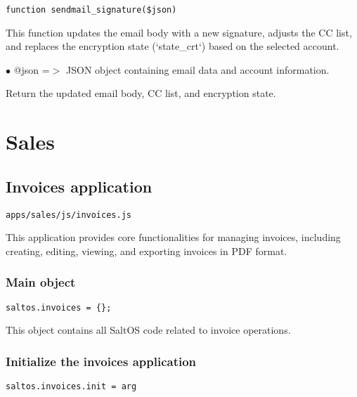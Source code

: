 \documentclass[a4paper]{article}
\begin{document}
\begin{lstlisting}
function sendmail_signature($json)
\end{lstlisting}

This function updates the email body with a new signature, adjusts the CC list,
and replaces the encryption state (`state\_crt`) based on the selected account.

\begin{compactitem}
\item[\color{myblue}$\bullet$] @json =$>$ JSON object containing email data and account information.
\end{compactitem}

Return the updated email body, CC list, and encryption state.


\hypertarget{toc153}{}
\section{Sales}

\hypertarget{toc154}{}
\subsection{Invoices application}

\begin{lstlisting}
apps/sales/js/invoices.js
\end{lstlisting}

This application provides core functionalities for managing invoices, including creating,
editing, viewing, and exporting invoices in PDF format.

\hypertarget{toc155}{}
\subsubsection{Main object}

\begin{lstlisting}
saltos.invoices = {};
\end{lstlisting}

This object contains all SaltOS code related to invoice operations.

\hypertarget{toc156}{}
\subsubsection{Initialize the invoices application}

\begin{lstlisting}
saltos.invoices.init = arg
\end{lstlisting}
\end{document}
